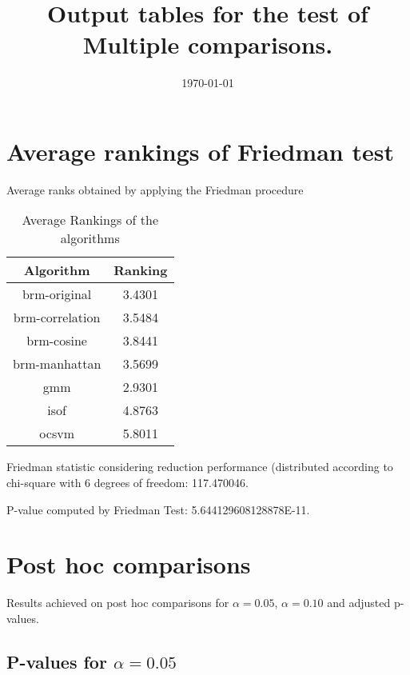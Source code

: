 \documentclass[a4paper,10pt]{article}
\title{Output tables for the test of Multiple comparisons.}
\author{}
\date{\today}
\begin{document}
\begin{landscape}
\pagestyle{empty}
\maketitle
\thispagestyle{empty}
\section{Average rankings of Friedman test}



Average ranks obtained by applying the Friedman procedure

\begin{table}[!htp]
\centering
\begin{tabular}{|c|c|}\hline
Algorithm&Ranking\\\hline
brm-original & 3.4301\\
brm-correlation & 3.5484\\
brm-cosine & 3.8441\\
brm-manhattan & 3.5699\\
gmm & 2.9301\\
isof & 4.8763\\
ocsvm & 5.8011\\
\hline
\end{tabular}
\caption{Average Rankings of the algorithms}
\end{table}

Friedman statistic considering reduction performance (distributed according to chi-square with 6 degrees of freedom: 117.470046.

P-value computed by Friedman Test: 5.644129608128878E-11.\newline



\pagebreak

\section{Post hoc comparisons}

Results achieved on post hoc comparisons for $\alpha = 0.05$, $\alpha = 0.10$ and adjusted p-values.

\subsection{P-values for $\alpha=0.05$}


\end{landscape}
\end{document}
